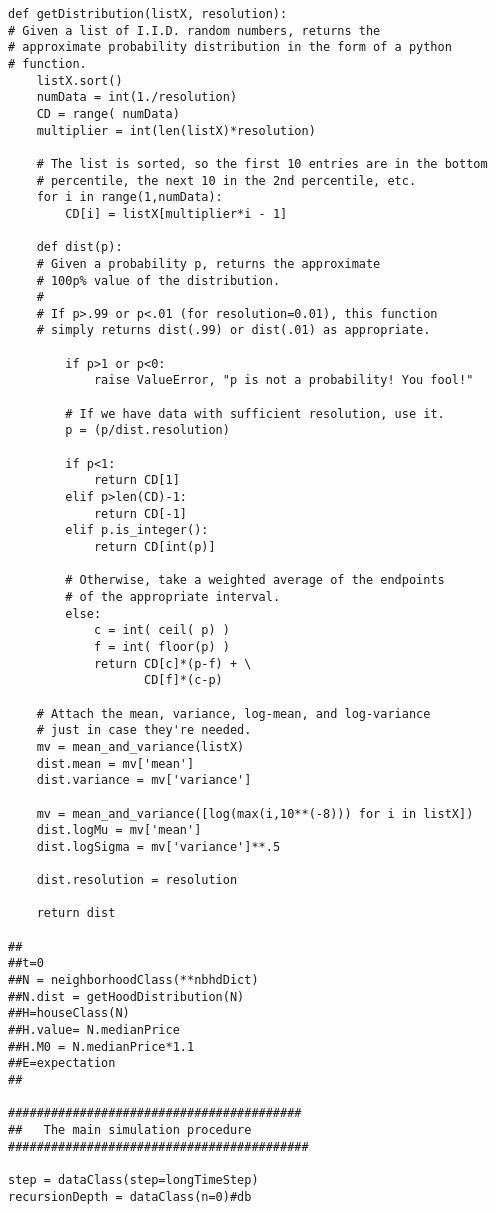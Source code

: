 \begin{lstlisting}
def getDistribution(listX, resolution):
# Given a list of I.I.D. random numbers, returns the
# approximate probability distribution in the form of a python
# function.
    listX.sort()
    numData = int(1./resolution)
    CD = range( numData)
    multiplier = int(len(listX)*resolution)

    # The list is sorted, so the first 10 entries are in the bottom
    # percentile, the next 10 in the 2nd percentile, etc.
    for i in range(1,numData):
        CD[i] = listX[multiplier*i - 1]
    
    def dist(p):
    # Given a probability p, returns the approximate
    # 100p% value of the distribution.
    #
    # If p>.99 or p<.01 (for resolution=0.01), this function
    # simply returns dist(.99) or dist(.01) as appropriate.
    
        if p>1 or p<0:
            raise ValueError, "p is not a probability! You fool!"

        # If we have data with sufficient resolution, use it.
        p = (p/dist.resolution)
        
        if p<1:
            return CD[1]
        elif p>len(CD)-1:
            return CD[-1]
        elif p.is_integer():
            return CD[int(p)]
    
        # Otherwise, take a weighted average of the endpoints
        # of the appropriate interval.
        else:
            c = int( ceil( p) )
            f = int( floor(p) )
            return CD[c]*(p-f) + \
                   CD[f]*(c-p)
    
    # Attach the mean, variance, log-mean, and log-variance
    # just in case they're needed.
    mv = mean_and_variance(listX)
    dist.mean = mv['mean']
    dist.variance = mv['variance']

    mv = mean_and_variance([log(max(i,10**(-8))) for i in listX])
    dist.logMu = mv['mean']
    dist.logSigma = mv['variance']**.5

    dist.resolution = resolution

    return dist
    
##        
##t=0   
##N = neighborhoodClass(**nbhdDict)
##N.dist = getHoodDistribution(N)
##H=houseClass(N)
##H.value= N.medianPrice
##H.M0 = N.medianPrice*1.1
##E=expectation
##    

#########################################
##   The main simulation procedure
##########################################

step = dataClass(step=longTimeStep)
recursionDepth = dataClass(n=0)#db


\end{lstlisting}
